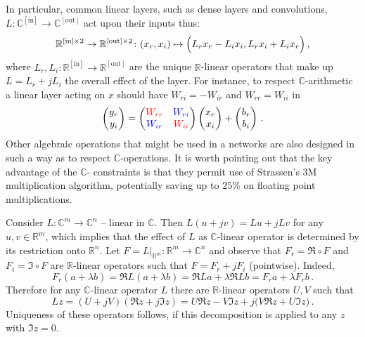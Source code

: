 \documentclass[a4paper,10pt]{article}
\newcommand{\real}{\mathbb{R}}
\newcommand{\cplx}{\mathbb{C}}
\begin{document}
In particular, common linear layers, such as dense layers and convolutions,
$
  L \colon \cplx^{\mathrm{[in]}}
    \to \cplx^{\mathrm{[out]}}
$ act upon their inputs thus:
$$
\real^{\mathrm{[in]} \times 2}
  \to \real^{\mathrm{[out]} \times 2}
  \colon (x_r, x_i)
    \mapsto \Bigl(
      L_r x_r - L_i x_i,
      L_r x_i + L_i x_r
    \Bigr)
  \,, $$
where $
  L_r, L_i
    \colon \real^{\mathrm{[in]}}
      \to \real^{\mathrm{[out]}}
$ are the unique $\real$-linear operators that make up $L = L_r + j L_i$ the overall
effect of the layer. For instance, to respect $\cplx$-arithmetic a linear layer acting
on $x$ should have $W_{ri} = - W_{ir}$ and $W_{rr} = W_{ii}$ in
$$
  \begin{pmatrix}
    y_r \\ y_i
  \end{pmatrix}
    = \begin{pmatrix}
      {\color{red} W_{rr}} & {\color{blue} W_{ri}} \\ 
      {\color{blue} W_{ir}} & {\color{red} W_{ii}}
    \end{pmatrix}
    \begin{pmatrix}
      x_r \\ x_i
    \end{pmatrix}
    + \begin{pmatrix}
      b_r \\ b_i
    \end{pmatrix}
  \,. $$
Other algebraic operations that might be used in a networks are also designed in such a way as
to respect $\cplx$-operations. It is worth pointing out that the key advantage of the $\cplx$-%
constraints is that they permit use of Strassen's $3$M multiplication algorithm, potentially
saving up to $25\%$ on floating point multiplications.

Consider $L\colon \cplx^m \to \cplx^n$ -- linear in $\cplx$. Then $
  L(u + jv) = L u + j L v
$ for any $u, v \in \real^m$, which implies that the effect of $L$ as $\cplx$-linear
operator is determined by its restriction onto $\real^n$. Let $
  F = L\vert_{\real^m}
  \colon \real^m \to \cplx^n
$ and observe that $F_r = \Re \circ F$ and $F_i = \Im \circ F$ are $\real$-linear operators
such that $F = F_r + j F_i$ (pointwise). Indeed,
$$
  F_r(a + \lambda b)
  = \Re L(a + \lambda b)
  = \Re L a + \lambda \Re L b
  = F_r a + \lambda F_r b
  \,. $$
Therefore for any $\cplx$-linear operator $L$ there are $\real$-linear operators $U, V$
such that
$$
L z 
  = (U + j V) (\Re z + j \Im z)
  = U \Re z - V \Im z + j \bigl( V \Re z + U \Im z \bigr)
  \,. $$
Uniqueness of these operators follows, if this decomposition is applied to any $z$ with
$\Im z = 0$.
\end{document}
